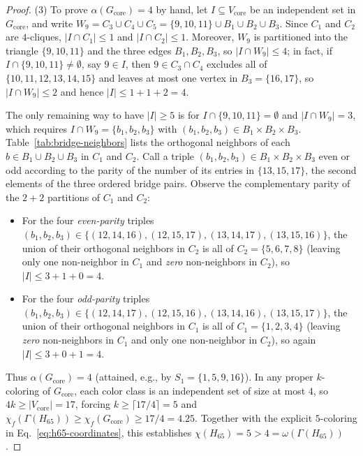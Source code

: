 \documentclass[
  aps,
  pra,
  reprint,
  superscriptaddress,
  amsmath,
  amssymb,
  nofootinbib,
  floatfix
]{revtex4-2}
\theoremstyle{definition}
\theoremstyle{remark}
\begin{document}
\begin{proof}
(3) To prove $\alpha(G_{\mathrm{core}})=4$ by hand, let $I\subseteq V_{\mathrm{core}}$ be an independent set in $G_{\mathrm{core}}$, and write $W_9=C_3\cup C_4\cup C_5=\{9,10,11\}\cup B_1\cup B_2\cup B_3$. Since $C_1$ and $C_2$ are $4$-cliques, $|I\cap C_1|\le1$ and $|I\cap C_2|\le1$. Moreover, $W_9$ is partitioned into the triangle $\{9,10,11\}$ and the three edges $B_1,B_2,B_3$, so $|I\cap W_9|\le 4$; in fact, if $I\cap\{9,10,11\}\ne\emptyset$, say $9\in I$, then $9\in C_3\cap C_4$ excludes all of $\{10,11,12,13,14,15\}$ and leaves at most one vertex in $B_3=\{16,17\}$, so $|I\cap W_9|\le2$ and hence $|I|\le 1+1+2=4$.

The only remaining way to have $|I|\ge 5$ is for $I\cap\{9,10,11\}=\emptyset$ and $|I\cap W_9|=3$, which requires $I\cap W_9=\{b_1,b_2,b_3\}$ with $(b_1,b_2,b_3)\in B_1\times B_2\times B_3$. Table~\ref{tab:bridge-neighbors} lists the orthogonal neighbors of each $b\in B_1\cup B_2\cup B_3$ in $C_1$ and $C_2$. Call a triple $(b_1,b_2,b_3)\in B_1\times B_2\times B_3$ even or odd according to the parity of the number of its entries in $\{13,15,17\}$, the second elements of the three ordered bridge pairs. Observe the complementary parity of the $2+2$ partitions of $C_1$ and $C_2$:
\begin{itemize}
\item For the four \emph{even-parity} triples $(b_1,b_2,b_3)\in\{(12,14,16),\allowbreak (12,15,17),\allowbreak (13,14,17),\allowbreak (13,15,16)\}$, the union of their orthogonal neighbors in $C_2$ is all of $C_2=\{5,6,7,8\}$ (leaving only one non-neighbor in $C_1$ and \emph{zero} non-neighbors in $C_2$), so $|I|\le 3+1+0=4$.
\item For the four \emph{odd-parity} triples $(b_1,b_2,b_3)\in\{(12,14,17),\allowbreak (12,15,16),\allowbreak (13,14,16),\allowbreak (13,15,17)\}$, the union of their orthogonal neighbors in $C_1$ is all of $C_1=\{1,2,3,4\}$ (leaving \emph{zero} non-neighbors in $C_1$ and only one non-neighbor in $C_2$), so again $|I|\le 3+0+1=4$.
\end{itemize}
Thus $\alpha(G_{\mathrm{core}})=4$ (attained, e.g., by $S_1=\{1,5,9,16\}$). In any proper $k$-coloring of $G_{\mathrm{core}}$, each color class is an independent set of size at most $4$, so $4k\ge |V_{\mathrm{core}}|=17$, forcing $k\ge\lceil 17/4\rceil=5$ and $\chi_f(\Gamma(H_{65}))\ge\chi_f(G_{\mathrm{core}})\ge 17/4=4.25$. Together with the explicit $5$-coloring in Eq.~\eqref{eq:h65-coordinates}, this establishes $\chi(H_{65})=5>4=\omega(\Gamma(H_{65}))$.


\end{proof}
\end{document}

